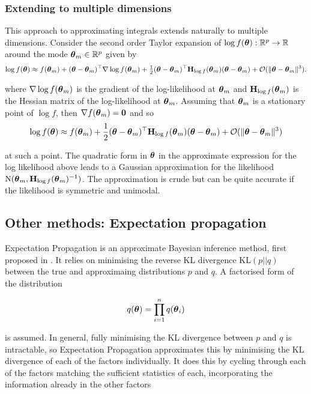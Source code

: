 \subsubsection{Extending to multiple dimensions}

This approach to approximating integrals extends naturally to multiple
dimensions. Consider the second order Taylor expansion of $\log f({\boldsymbol \theta}): {\mathbb{R}}^p
\to {\mathbb{R}}$ around the mode ${\boldsymbol \theta}_m \in {\mathbb{R}}^p$ given by
$$
\log f({\boldsymbol \theta}) \approx f({\boldsymbol \theta}_m) + ({\boldsymbol \theta} - {\boldsymbol \theta}_m)^\top \nabla \log f({\boldsymbol \theta}_m) + \tfrac{1}{2} ({\boldsymbol \theta} - {\boldsymbol \theta}_m)^\top {\bf H}_{\log f}({\boldsymbol \theta}_m) ({\boldsymbol \theta} - {\boldsymbol \theta}_m) + \mathcal{O}(\|{\boldsymbol \theta} - {\boldsymbol \theta}_m\|^3).
$$

where $\nabla \log f({\boldsymbol \theta}_m)$ is the gradient of the log-likelihood at
${\boldsymbol \theta}_m$ and ${\bf H}_{\log f}({\boldsymbol \theta}_m)$ is the Hessian matrix of the
log-likelihood at ${\boldsymbol \theta}_m$. Assuming that ${\boldsymbol \theta}_m$ is a stationary point
of $\log f$, then $\nabla f({\boldsymbol \theta}_m) = {\bf 0}$ and so
$$
\log f({\boldsymbol \theta}) \approx f({\boldsymbol \theta}_m) + \frac{1}{2} ({\boldsymbol \theta} - {\boldsymbol \theta}_m)^\top {\bf H}_{\log f}({\boldsymbol \theta}_m) ({\boldsymbol \theta} - {\boldsymbol \theta}_m) + \mathcal{O}(\|{\boldsymbol \theta} - {\boldsymbol \theta}_m\|^3)
$$

\noindent at such a point. The quadratic form in ${\boldsymbol \theta}$ in the approximate
expression for the log likelihood above leads to a Gaussian approximation for
the likelihood $\text{N}({\boldsymbol \theta}_m, {\bf H}_{\log f}({\boldsymbol \theta}_m)^{-1})$. The approximation
is crude but can be quite accurate if the likelihood is symmetric and unimodal.

\subsection{Other methods: Expectation propagation}

Expectation Propagation is an approximate Bayesian inference method, first
proposed in \citep{Minka2001}.  It relies on minimising the reverse KL
divergence $\text{KL}(p || q)$ between the true and approximaing distributions
$p$ and $q$. A factorised form of the distribution

\[
	q({\boldsymbol \theta}) = \prod_{i=1}^n q({\boldsymbol \theta}_i)
\]

is assumed. In general, fully minimising the KL divergence between $p$ and $q$
is intractable, so Expectation Propagation approximates this by minimising the
KL divergence of each of the factors individually.  It does this by cycling
through each of the factors matching the sufficient statistics of each,
incorporating the information already in the other factors

